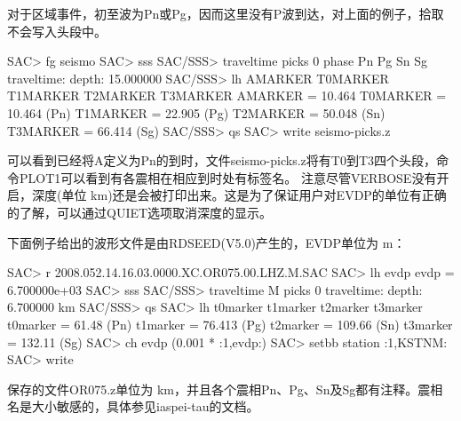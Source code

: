 对于区域事件，初至波为Pn或Pg，因而这里没有P波到达，对上面的例子，拾取不会写入头段中。
\begin{SACCode}
SAC> fg seismo
SAC> sss
SAC/SSS> traveltime picks 0 phase Pn Pg Sn Sg
traveltime: depth: 15.000000
SAC/SSS> lh AMARKER T0MARKER T1MARKER T2MARKER T3MARKER
AMARKER = 10.464
T0MARKER = 10.464           (Pn)
T1MARKER = 22.905           (Pg)
T2MARKER = 50.048           (Sn)
T3MARKER = 66.414           (Sg)
SAC/SSS> qs
SAC> write seismo-picks.z
\end{SACCode}
可以看到已经将A定义为Pn的到时，文件seismo-picks.z将有T0到T3四个头段，命令PLOT1可以看到有各震相在相应到时处有标签名。
注意尽管VERBOSE没有开启，深度(单位 \si{\km})还是会被打印出来。这是为了保证用户对EVDP的单位有正确的了解，可以通过QUIET选项取消深度的显示。

下面例子给出的波形文件是由RDSEED(V5.0)产生的，EVDP单位为 \si{\m}：
\begin{SACCode}
SAC> r 2008.052.14.16.03.0000.XC.OR075.00.LHZ.M.SAC
SAC> lh evdp
evdp = 6.700000e+03
SAC> sss
SAC/SSS> traveltime M picks 0
traveltime: depth: 6.700000 km
SAC/SSS> qs
SAC> lh t0marker t1marker t2marker t3marker
t0marker = 61.48            (Pn)
t1marker = 76.413           (Pg)
t2marker = 109.66           (Sn)
t3marker = 132.11           (Sg)
SAC> ch evdp (0.001 * :1,evdp:)
SAC> setbb station :1,KSTNM:
SAC> write %
\end{SACCode}
保存的文件OR075.z单位为 \si{\km}，并且各个震相Pn、Pg、Sn及Sg都有注释。震相名是大小敏感的，具体参见iaspei-tau的文档。
